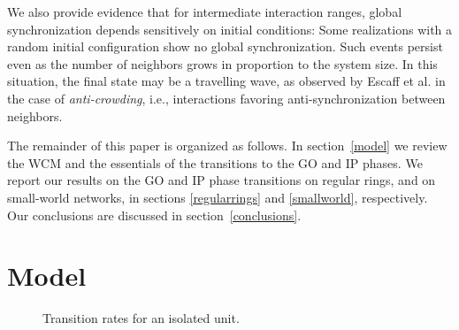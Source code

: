 We also provide evidence that for intermediate interaction ranges, global synchronization depends sensitively on initial conditions:
Some realizations with a random initial configuration show no global synchronization. Such events persist even as the number of
neighbors grows in proportion to the system size.  In this situation, the final state may be a travelling wave, as observed by Escaff
et al. \cite{escaff2014arrays} in the case of \textit{anti-crowding}, i.e., interactions favoring anti-synchronization between
neighbors.

The remainder of this paper is organized as follows. In section~\ref{model} we review the WCM and the essentials of the transitions to
the GO and IP phases.  We report our results on the GO and IP phase transitions on regular rings, and on small-world networks, in
sections \ref{regularrings} and \ref{smallworld}, respectively.  Our conclusions are discussed in section~\ref{conclusions}.


\section{\label{model} Model}


\begin{figure}[!b]
\begin{center}
\caption{\label{fig:taxas}
    Transition rates for an isolated unit.
    }
\end{center}
\end{figure}

